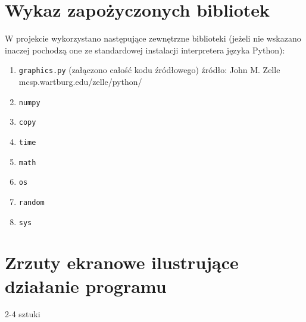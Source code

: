 \documentclass{article}
\begin{document}
\section{Wykaz zapożyczonych bibliotek}
W projekcie wykorzystano następujące zewnętrzne biblioteki (jeżeli nie wskazano inaczej pochodzą one ze standardowej instalacji interpretera języka Python):
    \begin{enumerate}
        \item \verb+graphics.py+ (załączono całość kodu źródłowego) źródło: John M. Zelle mcsp.wartburg.edu/zelle/python/
        \item \verb+numpy+
        \item \verb+copy+
        \item \verb+time+
        \item \verb+math+
        \item \verb+os+
        \item \verb+random+
        \item \verb+sys+
    \end{enumerate}
\section{Zrzuty ekranowe ilustrujące działanie programu}
2-4 sztuki
\end{document}
